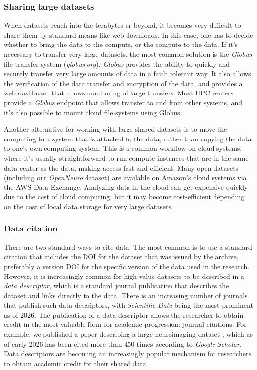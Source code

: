 \subsubsection{Sharing large datasets}

When datasets reach into the terabytes or beyond, it becomes very difficult to share them by standard means like web downloads.  In this case, one has to decide whether to bring the data to the compute, or the compute to the data. If it's necessary to transfer very large datasets, the most common solution is the \textit{Globus} file transfer system (\textit{globus.org}).  \textit{Globus} provides the ability to quickly and securely transfer very large amounts of data in a fault tolerant way.  It also allows the verification of the data transfer and encryption of the data, and provides a web dashboard that allows monitoring of large transfers.  Most HPC centers provide a \textit{Globus} endpoint that allows transfer to and from other systems, and it's also possible to mount cloud file systems using Globus.

Another alternative for working with large shared datasets is to move the computing to a system that is attached to the data, rather than copying the data to one's own computing system.  This is a common workflow on cloud systems, where it's usually straightforward to run compute instances that are in the same data center as the data, making access fast and efficient. Many open datasets (including our \textit{OpenNeuro} dataset) are available on Amazon's cloud systems via the AWS Data Exchange.  Analyzing data in the cloud can get expensive quickly due to the cost of cloud computing, but it may become cost-efficient depending on the cost of local data storage for very large datasets.

\subsubsection{Data citation}

There are two standard ways to cite data. The most common is to use a standard citation that includes the DOI for the dataset that was issued by the archive, preferably a version DOI for the specific version of the data used in the research.  However, it is increasingly common for high-value datasets to be described in a \textit{data descriptor}, which is a standard journal publication that describes the dataset and links directly to the data.  There is an increasing number of journals that publish such data descriptors, with \textit{Scientific Data} being the most prominent as of 2026.  The publication of a data descriptor allows the researcher to obtain credit in the most valuable form for academic progression: journal citations.  For example, we published a paper describing a large neuroimaging dataset \citep{Poldrack:2016aa}, which as of early 2026 has been cited more than 450 times according to \textit{Google Scholar}. Data descriptors are becoming an increasingly popular mechanism for researchers to obtain academic credit for their shared data.


